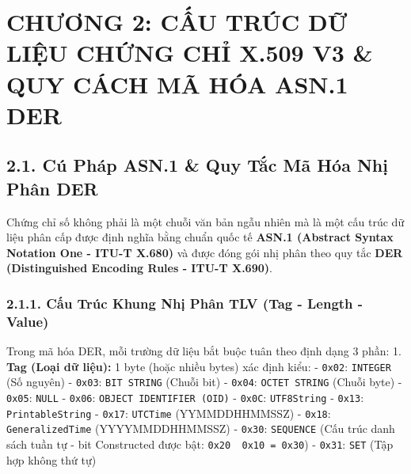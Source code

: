 \documentclass[
]{article}
\begin{document}
\section{CHƯƠNG 2: CẤU TRÚC DỮ LIỆU CHỨNG CHỈ X.509 V3 \& QUY CÁCH MÃ
HÓA ASN.1
DER}\label{chux1b0ux1a1ng-2-cux1ea5u-truxfac-dux1eef-liux1ec7u-chux1ee9ng-chux1ec9-x.509-v3-quy-cuxe1ch-muxe3-huxf3a-asn.1-der}

\subsection{2.1. Cú Pháp ASN.1 \& Quy Tắc Mã Hóa Nhị Phân
DER}\label{cuxfa-phuxe1p-asn.1-quy-tux1eafc-muxe3-huxf3a-nhux1ecb-phuxe2n-der}

Chứng chỉ số không phải là một chuỗi văn bản ngẫu nhiên mà là một cấu
trúc dữ liệu phân cấp được định nghĩa bằng chuẩn quốc tế \textbf{ASN.1
(Abstract Syntax Notation One - ITU-T X.680)} và được đóng gói nhị phân
theo quy tắc \textbf{DER (Distinguished Encoding Rules - ITU-T X.690)}.

\subsubsection{2.1.1. Cấu Trúc Khung Nhị Phân TLV (Tag - Length -
Value)}\label{cux1ea5u-truxfac-khung-nhux1ecb-phuxe2n-tlv-tag---length---value}

Trong mã hóa DER, mỗi trường dữ liệu bắt buộc tuân theo định dạng 3
phần: 1. \textbf{Tag (Loại dữ liệu):} 1 byte (hoặc nhiều bytes) xác định
kiểu: - \texttt{0x02}: \texttt{INTEGER} (Số nguyên) - \texttt{0x03}:
\texttt{BIT\ STRING} (Chuỗi bit) - \texttt{0x04}: \texttt{OCTET\ STRING}
(Chuỗi byte) - \texttt{0x05}: \texttt{NULL} - \texttt{0x06}:
\texttt{OBJECT\ IDENTIFIER\ (OID)} - \texttt{0x0C}: \texttt{UTF8String}
- \texttt{0x13}: \texttt{PrintableString} - \texttt{0x17}:
\texttt{UTCTime} (YYMMDDHHMMSSZ) - \texttt{0x18}:
\texttt{GeneralizedTime} (YYYYMMDDHHMMSSZ) - \texttt{0x30}:
\texttt{SEQUENCE} (Cấu trúc danh sách tuần tự - bit Constructed được
bật: \texttt{0x20\ \textbar{}\ 0x10\ =\ 0x30}) - \texttt{0x31}:
\texttt{SET} (Tập hợp không thứ tự)
\end{document}
